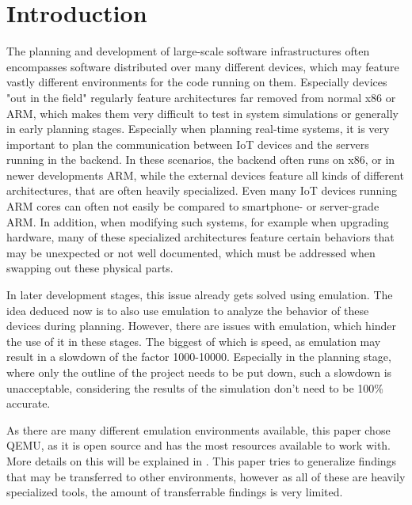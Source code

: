 
\chapter{Introduction}
The planning and development of large-scale software infrastructures often encompasses software distributed over many different devices,
which may feature vastly different environments for the code running on them.
Especially devices "out in the field" regularly feature architectures far removed from normal x86 or ARM,
which makes them very difficult to test in system simulations or generally in early planning stages.
Especially when planning real-time systems,
it is very important to plan the communication between IoT devices and the servers running in the backend.
In these scenarios, the backend often runs on x86, or in newer developments ARM,
while the external devices feature all kinds of different architectures,
that are often heavily specialized.
Even many IoT devices running ARM cores can often not easily be compared to smartphone-
or server-grade ARM.
In addition, when modifying such systems, for example when upgrading hardware,
many of these specialized architectures feature certain behaviors that may be unexpected or not well documented,
which must be addressed when swapping out these physical parts.

In later development stages, this issue already gets solved using emulation.
The idea deduced now is to also use emulation to analyze the behavior of these devices during planning.
However, there are issues with emulation, which hinder the use of it in these stages.
The biggest of which is speed, as emulation may result in a slowdown of the factor 1000-10000\cite{slowdown}.
Especially in the planning stage, where only the outline of the project needs to be put down,
such a slowdown is unacceptable, considering the results of the simulation don't need to be 100\% accurate.

As there are many different emulation environments available,
this paper chose QEMU, as it is open source and has the most resources available to work with.
More details on this will be explained in .
This paper tries to generalize findings that may be transferred to other environments,
however as all of these are heavily specialized tools,
the amount of transferrable findings is very limited.

